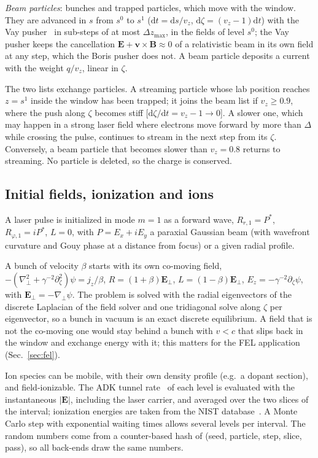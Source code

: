 \documentclass[preprint,12pt]{elsarticle}
\newcommand{\dd}{\mathrm{d}}
\begin{document}
\emph{Beam particles}: bunches and trapped particles, which move with the window. They are advanced in $s$ from $s^0$ to $s^1$ ($\dd t = \dd s/v_z$, $\dd\zeta = (v_z - 1)\dd t$) with the Vay pusher~\cite{Vay2008} in sub-steps of at most $\Delta z_\mathrm{max}$, in the fields of level $s^0$; the Vay pusher keeps the cancellation $\bm E + \bm v\times\bm B \approx 0$ of a relativistic beam in its own field at any step, which the Boris pusher does not. A beam particle deposits a current with the weight $q/v_z$, linear in $\zeta$.

The two lists exchange particles. A streaming particle whose lab position reaches $z = s^1$ inside the window has been trapped; it joins the beam list if $v_z \ge 0.9$, where the push along $\zeta$ becomes stiff [$\dd\zeta/\dd t = v_z - 1 \to 0$]. A slower one, which may happen in a strong laser field where electrons move forward by more than $\Delta$ while crossing the pulse, continues to stream in the next step from its $\zeta$. Conversely, a beam particle that becomes slower than $v_z = 0.8$ returns to streaming. No particle is deleted, so the charge is conserved.

\subsection{Initial fields, ionization and ions}

A laser pulse is initialized in mode $m=1$ as a forward wave, $R_{r,1} = P^*$, $R_{\varphi,1} = iP^*$, $L = 0$, with $P = E_x + iE_y$ a paraxial Gaussian beam (with wavefront curvature and Gouy phase at a distance from focus) or a given radial profile.

A bunch of velocity $\beta$ starts with its own co-moving field, $-(\nabla_\perp^2 + \gamma^{-2}\partial_\zeta^2)\psi = j_z/\beta$, $R = (1 + \beta)\bm E_\perp$, $L = (1-\beta)\bm E_\perp$, $E_z = -\gamma^{-2}\partial_\zeta\psi$, with $\bm E_\perp = -\nabla_\perp\psi$. The problem is solved with the radial eigenvectors of the discrete Laplacian of the field solver and one tridiagonal solve along $\zeta$ per eigenvector, so a bunch in vacuum is an exact discrete equilibrium. A field that is not the co-moving one would stay behind a bunch with $v < c$ that slips back in the window and exchange energy with it; this matters for the FEL application (Sec.~\ref{sec:fel}).

Ion species can be mobile, with their own density profile (e.g.\ a dopant section), and field-ionizable. The ADK tunnel rate~\cite{ADK1986,Chen2013} of each level is evaluated with the instantaneous $|\bm E|$, including the laser carrier, and averaged over the two slices of the interval; ionization energies are taken from the NIST database~\cite{NIST}. A Monte Carlo step with exponential waiting times allows several levels per interval. The random numbers come from a counter-based hash of (seed, particle, step, slice, pass), so all back-ends draw the same numbers.
\end{document}
